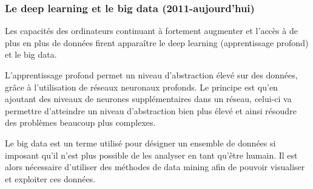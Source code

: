 \subsubsection{Le deep learning et le big data (2011-aujourd'hui)}

Les capacités des ordinateurs continuant à fortement augmenter et l'accès à de plus en plus de données firent apparaître le deep learning (apprentissage profond) et le big data.

L'apprentissage profond permet un niveau d'abstraction élevé sur des données, grâce à l'utilisation de réseaux neuronaux profonds.
Le principe est qu'en ajoutant des niveaux de neurones supplémentaires dans un réseau, celui-ci va permettre d'atteindre un niveau d'abstraction bien plus élevé et ainsi résoudre des problèmes beaucoup plus complexes.

Le big data est un terme utilisé pour désigner un ensemble de données si imposant qu'il n'est plus possible de les analyser en tant qu'être humain.
Il est alors nécessaire d'utiliser des méthodes de data mining afin de pouvoir visualiser et exploiter ces données.
